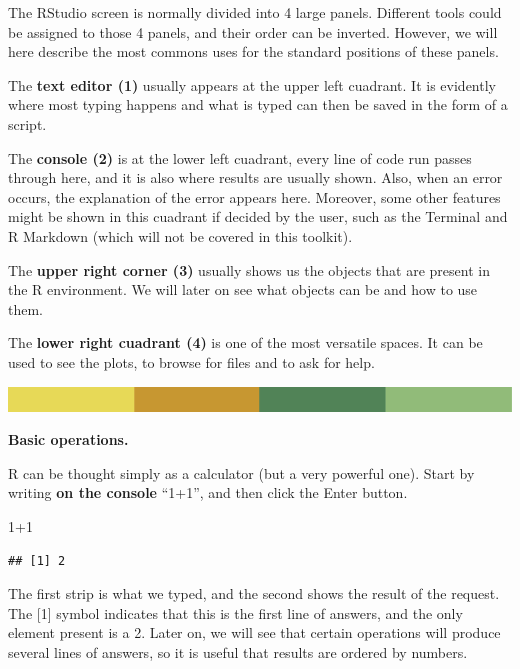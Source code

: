 \documentclass[
]{book}
\newenvironment{Shaded}{\begin{snugshade}}{\end{snugshade}}
\newcommand{\DecValTok}[1]{\textcolor[rgb]{0.00,0.00,0.81}{#1}}
\newcommand{\SpecialCharTok}[1]{\textcolor[rgb]{0.00,0.00,0.00}{#1}}
\begin{document}
The RStudio screen is normally divided into 4 large panels. Different tools could be assigned to those 4 panels, and their order can be inverted. However, we will here describe the most commons uses for the standard positions of these panels.

The \textbf{text editor (1)} usually appears at the upper left cuadrant. It is evidently where most typing happens and what is typed can then be saved in the form of a script.

The \textbf{console (2)} is at the lower left cuadrant, every line of code run passes through here, and it is also where results are usually shown. Also, when an error occurs, the explanation of the error appears here. Moreover, some other features might be shown in this cuadrant if decided by the user, such as the Terminal and R Markdown (which will not be covered in this toolkit).

The \textbf{upper right corner (3)} usually shows us the objects that are present in the R environment. We will later on see what objects can be and how to use them.

The \textbf{lower right cuadrant (4)} is one of the most versatile spaces. It can be used to see the plots, to browse for files and to ask for help.

\includegraphics{rsrstrip.png}

\textbf{Basic operations.}

R can be thought simply as a calculator (but a very powerful one). Start by writing \textbf{on the console} ``1+1'', and then click the Enter button.

\begin{Shaded}
\begin{Highlighting}[]
\DecValTok{1}\SpecialCharTok{+}\DecValTok{1} 
\end{Highlighting}
\end{Shaded}

\begin{verbatim}
## [1] 2
\end{verbatim}

The first strip is what we typed, and the second shows the result of the request. The {[}1{]} symbol indicates that this is the first line of answers, and the only element present is a 2. Later on, we will see that certain operations will produce several lines of answers, so it is useful that results are ordered by numbers.
\end{document}
